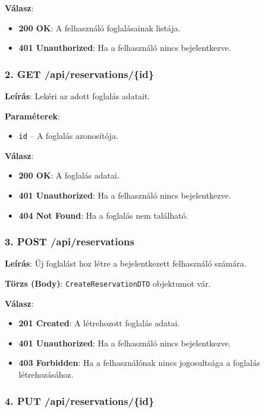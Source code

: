 \documentclass{report}[11pt]
\begin{document}
\textbf{Válasz}:  
\begin{itemize}
    \item \textbf{200 OK}: A felhasználó foglalásainak listája.
    \item \textbf{401 Unauthorized}: Ha a felhasználó nincs bejelentkezve.
\end{itemize}

\subsubsection{2. GET /api/reservations/\{id\}}

\textbf{Leírás}:  
Lekéri az adott foglalás adatait.

\textbf{Paraméterek}:  
\begin{itemize}
    \item \texttt{id} – A foglalás azonosítója.
\end{itemize}

\textbf{Válasz}:  
\begin{itemize}
    \item \textbf{200 OK}: A foglalás adatai.
    \item \textbf{401 Unauthorized}: Ha a felhasználó nincs bejelentkezve.
    \item \textbf{404 Not Found}: Ha a foglalás nem található.
\end{itemize}

\subsubsection{3. POST /api/reservations}

\textbf{Leírás}:  
Új foglalást hoz létre a bejelentkezett felhasználó számára.

\textbf{Törzs (Body)}:  
\texttt{CreateReservationDTO} objektumot vár.

\textbf{Válasz}:  
\begin{itemize}
    \item \textbf{201 Created}: A létrehozott foglalás adatai.
    \item \textbf{401 Unauthorized}: Ha a felhasználó nincs bejelentkezve.
    \item \textbf{403 Forbidden}: Ha a felhasználónak nincs jogosultsága a foglalás létrehozásához.
\end{itemize}

\subsubsection{4. PUT /api/reservations/\{id\}}
\end{document}
